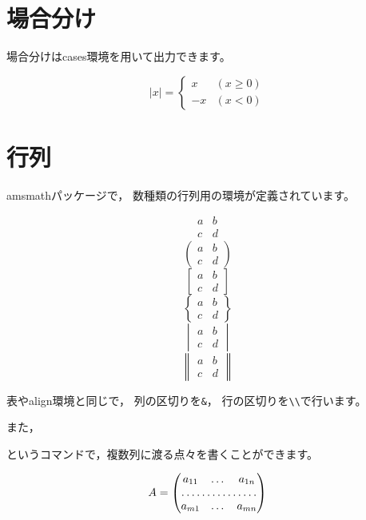 \documentclass[class=jreport, crop=false, preview=false, dvipdfmx, fleqn]{standalone}
\begin{document}
\section{場合分け}
場合分けはcases環境を用いて出力できます。

\begin{IOTeX}
\[
| x | =
\begin{cases}
x & (x \geq 0) \\
-x & (x < 0)
\end{cases}
\]
\end{IOTeX}



\section{行列}
amsmathパッケージで，
数種類の行列用の環境が定義されています。

\begin{IOTeX}
\[
\begin{matrix}
a & b \\
c & d
\end{matrix}
\]
\[
\begin{pmatrix}
a & b \\
c & d
\end{pmatrix}
\]
\[
\begin{bmatrix}
a & b \\
c & d
\end{bmatrix}
\]
\[
\begin{Bmatrix}
a & b \\
c & d
\end{Bmatrix}
\]
\[
\begin{vmatrix}
a & b \\
c & d
\end{vmatrix}
\]
\[
\begin{Vmatrix}
a & b \\
c & d
\end{Vmatrix}
\]
\end{IOTeX}

表やalign環境と同じで，
列の区切りを\verb|&|，
行の区切りを\verb|\\|で行います。

また，
\begin{ITeX}
\end{ITeX}
というコマンドで，複数列に渡る点々を書くことができます。

\begin{IOTeX}
\[
A = 
\begin{pmatrix}
a_{11} & \dots & a_{1n}\\
\hdotsfor{3} \\
a_{m1} & \dots & a_{mn}
\end{pmatrix}
\]
\end{IOTeX}
\end{document}
